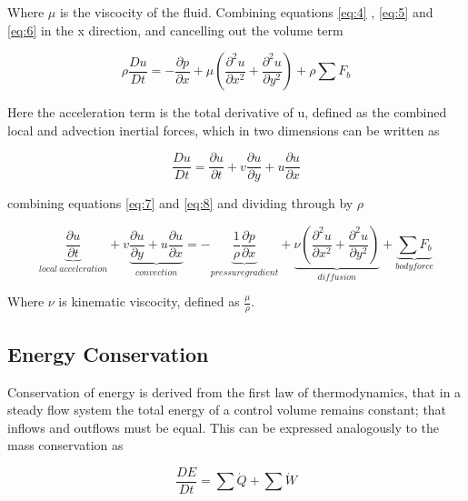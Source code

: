     Where $\mu$ is the viscocity of the fluid. Combining equations \ref{eq:4} , \ref{eq:5} and \ref{eq:6} in the x direction, and cancelling out the volume term

    \begin{equation} \label{eq:7}
      \rho \frac{Du}{Dt} = - \frac{\partial p}{\partial x} + \mu (\frac{\partial^2 u}{\partial x^2} + \frac{\partial^2 u}{\partial y^2}) + \rho \sum F_{b}
    \end{equation}
    
    Here the acceleration term is the total derivative of u, defined as the combined local and advection inertial forces, which in two dimensions can be written as

    \begin{equation} \label{eq:8}
      \frac{Du}{Dt} = \frac{\partial u}{\partial t} + v \frac{\partial u}{\partial y} + u \frac{\partial u}{\partial x}
    \end{equation}

    combining equations \ref{eq:7} and \ref{eq:8} and dividing through by $\rho$

    \begin{equation} \label{eq:9}
      \underbrace{\frac{\partial u}{\partial t}}_{local\ acceleration} + v \underbrace{\frac{\partial u}{\partial y} + u \frac{\partial u}{\partial x}}_{convection} = - \underbrace{\frac{1}{\rho} \frac{\partial p}{\partial x}}_{pressure gradient} + \underbrace{\nu (\frac{\partial^2 u}{\partial x^2} + \frac{\partial^2 u}{\partial y^2})}_{diffusion} + \underbrace{\sum F_{b}}_{body force}
    \end{equation}

    Where $\nu$ is kinematic viscocity, defined as $\frac{\mu}{\rho}$. 

    \subsection{Energy Conservation}

    Conservation of energy is derived from the first law of thermodynamics, that in a steady flow system the total energy of a control volume remains constant; that inflows and outflows must be equal. This can be expressed analogously to the mass conservation as 

    \begin{equation} \label{eq:10}
      \frac{DE}{Dt} = \sum{\dot{Q}} + \sum{\dot{W}}
    \end{equation}

